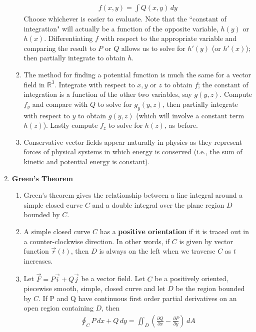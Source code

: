\documentclass[10pt]{article}
\begin{document}
\begin{multicols*}{2}
\begin{enumerate}
\begin{enumerate}
\begin{align*}
            f(x,y) = \int Q(x,y) \,dy
        \end{align*}
        Choose whichever is easier to evaluate. Note that the ``constant of integration" will actually be a function of the opposite variable, $h(y)$ or $h(x)$. Differentiating $f$ with respect to the appropriate variable and comparing the result to $P$ or $Q$ allows us to solve for $h'(y)$ (or $h'(x)$); then partially integrate to obtain $h$.
        \item The method for finding a potential function is much the same for a vector field in $\mathbb{R}^3$. Integrate with respect to $x,y$ or $z$ to obtain $f$; the constant of integration is a function of the other two variables, say $g(y,z)$. Compute $f_y$ and compare with $Q$ to solve for $g_y(y,z)$, then partially integrate with respect to $y$ to obtain $g(y,z)$ (which will involve a constant term $h(z)$). Lastly compute $f_z$ to solve for $h(z)$, as before.
        \item Conservative vector fields appear naturally in physics as they represent forces of physical systems in which energy is conserved (i.e., the sum of kinetic and potential energy is constant).
    \end{enumerate}
    
    \item \textbf{Green's Theorem}
    \begin{enumerate}
        \item Green's theorem gives the relationship between a line integral around a simple closed curve $C$ and a double integral over the plane region $D$ bounded by $C$.
        \item A simple closed curve $C$ has a \textbf{positive orientation} if it is traced out in a counter-clockwise direction. In other words, if $C$ is given by vector function $\vec{r}(t)$, then $D$ is always on the left when we traverse $C$ as $t$ increases.
        \item Let $\vec{F} = P\vec{i} + Q\vec{j}$ be a vector field. Let $C$ be a positively oriented, piecewise smooth, simple, closed curve and let $D$ be the region bounded by $C$. If P and Q have continuous first order partial derivatives on an open region containing $D$, then
        \begin{align*}
            \oint_C P \,dx + Q \,dy = \iint_D \left( \frac{\partial Q}{\partial x} - \frac{\partial P}{\partial y}\right) \, dA
        \end{align*}
        

\end{enumerate}
\end{enumerate}
\end{multicols*}
\end{document}
